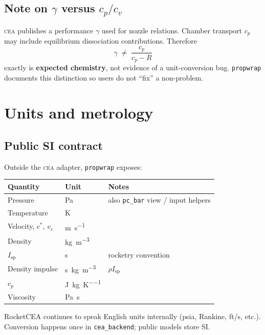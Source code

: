 \documentclass[11pt,a4paper]{report}
\newcommand{\pw}{\texttt{propwrap}}
\newcommand{\cea}{\textsc{cea}}
\newcommand{\Isp}{I_{\mathrm{sp}}}
\newcommand{\cstar}{c^{*}}
\newcommand{\ve}{v_{e}}
\begin{document}
\section{Note on $\gamma$ versus $c_p/c_v$}

\cea{} publishes a performance $\gamma$ used for nozzle relations. Chamber
transport $c_p$ may include equilibrium dissociation contributions. Therefore
\begin{equation}
  \gamma \;\neq\; \frac{c_p}{c_p - R}
  \label{eq:gamma_not_cp}
\end{equation}
exactly is \textbf{expected chemistry}, not evidence of a unit-conversion bug.
\pw{} documents this distinction so users do not ``fix'' a non-problem.

\chapter{Units and metrology}
\label{ch:units}

\section{Public SI contract}

Outside the \cea{} adapter, \pw{} exposes:

\begin{center}
\begin{tabular}{@{}lll@{}}
\toprule
Quantity & Unit & Notes \\
\midrule
Pressure & \si{\pascal} & also \texttt{pc\_bar} view / input helpers \\
Temperature & \si{\kelvin} & \\
Velocity, $\cstar$, $\ve$ & \si{\metre\per\second} & \\
Density & \si{\kilogram\per\metre\cubed} & \\
$\Isp$ & \si{\second} & rocketry convention \\
Density impulse & \si{\second\kilogram\per\metre\cubed} & $\rho\Isp$ \\
$c_p$ & \si{\joule\per\kilogram\per\kelvin} & \\
Viscosity & \si{\pascal\second} & \\
\bottomrule
\end{tabular}
\end{center}

RocketCEA continues to speak English units internally (psia, Rankine, ft/s,
etc.). Conversion happens once in \texttt{cea\_backend}; public models store SI.
\end{document}

